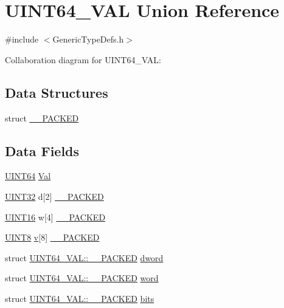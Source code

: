 \hypertarget{union_u_i_n_t64___v_a_l}{}\section{U\+I\+N\+T64\+\_\+\+V\+A\+L Union Reference}
\label{union_u_i_n_t64___v_a_l}


{\ttfamily \#include $<$Generic\+Type\+Defs.\+h$>$}



Collaboration diagram for U\+I\+N\+T64\+\_\+\+V\+A\+L\+:
\subsection*{Data Structures}
\begin{DoxyCompactItemize}
\item 
struct \hyperlink{struct_u_i_n_t64___v_a_l_1_1_____p_a_c_k_e_d}{\+\_\+\+\_\+\+P\+A\+C\+K\+E\+D}
\end{DoxyCompactItemize}
\subsection*{Data Fields}
\begin{DoxyCompactItemize}
\item 
\hyperlink{_generic_type_defs_8h_adf2ee0d53f8143913aae1a605d44326d}{U\+I\+N\+T64} \hyperlink{union_u_i_n_t64___v_a_l_a63ec8f238c3a98b7c5580ae63e7fc78b}{Val}
\item 
\hyperlink{_generic_type_defs_8h_a1720f33f59b583f0c2ed071815623a86}{U\+I\+N\+T32} d\mbox{[}2\mbox{]} \hyperlink{union_u_i_n_t64___v_a_l_a4f64eab2499d3a2aaf5335072c26dfd9}{\+\_\+\+\_\+\+P\+A\+C\+K\+E\+D}
\item 
\hyperlink{_generic_type_defs_8h_acfa284fa8026c4aace2728f7f15d6c13}{U\+I\+N\+T16} w\mbox{[}4\mbox{]} \hyperlink{union_u_i_n_t64___v_a_l_ab63eec0f235e33631b3f77d76c82594f}{\+\_\+\+\_\+\+P\+A\+C\+K\+E\+D}
\item 
\hyperlink{_generic_type_defs_8h_ab27e9918b538ce9d8ca692479b375b6a}{U\+I\+N\+T8} \hyperlink{_s_p_i_flash_8c_a51a3fc6fe361f8f5a7a91799fecd2c9a}{v}\mbox{[}8\mbox{]} \hyperlink{union_u_i_n_t64___v_a_l_a1200ea45452f549cdb4cfc2fa5d5842f}{\+\_\+\+\_\+\+P\+A\+C\+K\+E\+D}
\item 
struct \hyperlink{struct_u_i_n_t64___v_a_l_1_1_____p_a_c_k_e_d}{U\+I\+N\+T64\+\_\+\+V\+A\+L\+::\+\_\+\+\_\+\+P\+A\+C\+K\+E\+D} \hyperlink{union_u_i_n_t64___v_a_l_ae37dd624bb6d29989545a04214326751}{dword}
\item 
struct \hyperlink{struct_u_i_n_t64___v_a_l_1_1_____p_a_c_k_e_d}{U\+I\+N\+T64\+\_\+\+V\+A\+L\+::\+\_\+\+\_\+\+P\+A\+C\+K\+E\+D} \hyperlink{union_u_i_n_t64___v_a_l_a389c31af76ebf129e4c0b4c30ace5b51}{word}
\item 
struct \hyperlink{struct_u_i_n_t64___v_a_l_1_1_____p_a_c_k_e_d}{U\+I\+N\+T64\+\_\+\+V\+A\+L\+::\+\_\+\+\_\+\+P\+A\+C\+K\+E\+D} \hyperlink{union_u_i_n_t64___v_a_l_a500a78869a8c173f5190c31ab365578f}{bits}
\end{DoxyCompactItemize}


